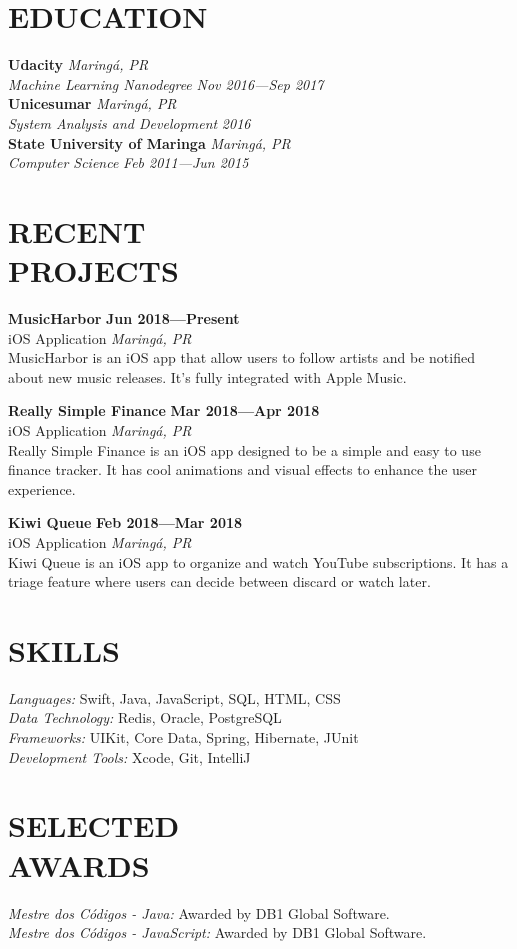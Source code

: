 \documentclass[line,margin]{res}
\begin{document}
\begin{resume}
\section{EDUCATION}
  {\bf Udacity} \hfill {\sl Maring\'a, PR} \\
  {\sl Machine Learning Nanodegree} \hfill {\sl Nov 2016---Sep 2017}\\[6pt]
  {\bf Unicesumar} \hfill {\sl Maring\'a, PR} \\
  {\sl System Analysis and Development} \hfill {\sl 2016}\\[6pt]
  {\bf State University of Maringa} \hfill {\sl Maring\'a, PR} \\
  {\sl Computer Science} \hfill {\sl Feb 2011---Jun 2015}


\section{RECENT \\ PROJECTS}
  {\bf MusicHarbor} \hfill {\bf Jun 2018---Present} \\
  iOS Application \hfill {\sl Maring\'a, PR}\\[6pt]
  MusicHarbor is an iOS app that allow users to follow artists and be notified about new music releases.
  It's fully integrated with Apple Music.
  
  {\bf Really Simple Finance} \hfill {\bf Mar 2018---Apr 2018} \\
  iOS Application \hfill {\sl Maring\'a, PR}\\[6pt]
  Really Simple Finance is an iOS app designed to be a simple and easy to use finance tracker.
  It has cool animations and visual effects to enhance the user experience.

  {\bf Kiwi Queue} \hfill {\bf Feb 2018---Mar 2018} \\
  iOS Application \hfill {\sl Maring\'a, PR}\\[6pt]
  Kiwi Queue is an iOS app to organize and watch YouTube subscriptions.
  It has a triage feature where users can decide between discard or watch later.


\section{SKILLS}
  {\sl Languages:} Swift, Java, JavaScript, SQL, HTML, CSS \\
  {\sl Data Technology:} Redis, Oracle, PostgreSQL \\
  {\sl Frameworks:} UIKit, Core Data, Spring, Hibernate, JUnit \\
  {\sl Development Tools:} Xcode, Git, IntelliJ


\section{SELECTED \\ AWARDS}             
  {\sl Mestre dos C\'odigos - Java:} Awarded by DB1 Global Software.\\
  {\sl Mestre dos C\'odigos - JavaScript:} Awarded by DB1 Global Software.\\
 

\end{resume}
\end{document}

